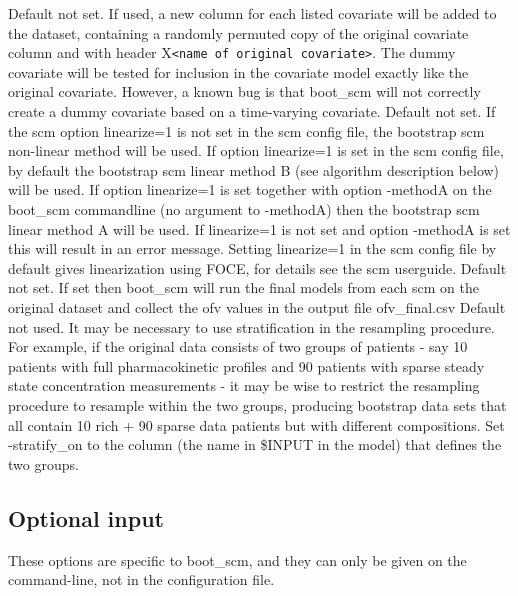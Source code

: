\begin{optionlist}
Default not set. If used, a new column for each listed covariate will be added to the dataset, 														  
containing a randomly permuted copy of the original covariate column and with header X\verb|<name of original covariate>|. 
The dummy covariate will be tested for inclusion in the covariate model exactly like the original covariate. 
However, a known bug is that boot\_scm will not correctly create a 
dummy covariate based on a time-varying covariate.
\nextopt
{}
Default not set. If the scm option linearize=1 is not set in the scm config file, 
the bootstrap scm non-linear method will be used. If option linearize=1 is set in the scm config file, 
by default the bootstrap scm linear method B (see algorithm description below) will be used. 
If option linearize=1 is set  together with option -methodA on the boot\_scm commandline (no argument to -methodA) 
then the bootstrap scm linear method A will be used. If linearize=1 
is not set and option -methodA is set this will result in an error message.  
Setting linearize=1 in the scm config file by default gives linearization using FOCE, for details see the
scm userguide.
\nextopt
{}
Default not set. If set then boot\_scm will run the final models from each scm on the original dataset and collect the ofv values 
in the output file ofv\_final.csv   
\nextopt
{}
Default not used. It may be necessary to use stratification in the resampling procedure. For example, if the original data consists of two groups 
of patients - say 10 patients with full pharmacokinetic profiles and 90 patients with sparse steady state concentration measurements - it may be 
wise to restrict the resampling procedure to resample within the two groups, producing bootstrap data sets that all contain 10 rich + 90 sparse 
data patients but with different compositions. 
Set -stratify\_on to the column (the name in \$INPUT in the model) that defines the two groups.
\nextopt
\end{optionlist}

\begin{optionlist}
\subsection{Optional input}
These options are specific to boot\_scm, and they can only be given on the command-line, not in the configuration file.
\end{optionlist}
